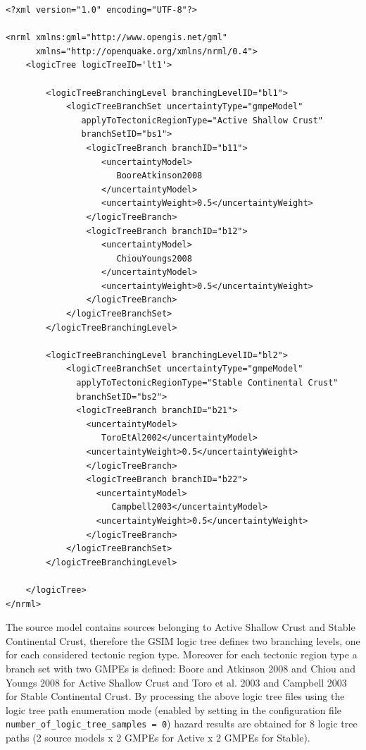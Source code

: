 \begin{Verbatim}[frame=single, commandchars=\\\{\}, fontsize=\normalsize]
<?xml version="1.0" encoding="UTF-8"?>

<nrml xmlns:gml="http://www.opengis.net/gml"
      xmlns="http://openquake.org/xmlns/nrml/0.4">
    <logicTree logicTreeID='lt1'>

        <logicTreeBranchingLevel branchingLevelID="bl1">
            <logicTreeBranchSet uncertaintyType="gmpeModel"
               applyToTectonicRegionType="Active Shallow Crust"
               branchSetID="bs1">
                <logicTreeBranch branchID="b11">
                   <uncertaintyModel>
                      BooreAtkinson2008
                   </uncertaintyModel>
                   <uncertaintyWeight>0.5</uncertaintyWeight>
                </logicTreeBranch>
                <logicTreeBranch branchID="b12">
                   <uncertaintyModel>
                      ChiouYoungs2008
                   </uncertaintyModel>
                   <uncertaintyWeight>0.5</uncertaintyWeight>
                </logicTreeBranch>
            </logicTreeBranchSet>
        </logicTreeBranchingLevel>

        <logicTreeBranchingLevel branchingLevelID="bl2">
            <logicTreeBranchSet uncertaintyType="gmpeModel"
              applyToTectonicRegionType="Stable Continental Crust"
              branchSetID="bs2">
              <logicTreeBranch branchID="b21">
                <uncertaintyModel>
                   ToroEtAl2002</uncertaintyModel>
                <uncertaintyWeight>0.5</uncertaintyWeight>
                </logicTreeBranch>
                <logicTreeBranch branchID="b22">
                  <uncertaintyModel>
                     Campbell2003</uncertaintyModel>
                  <uncertaintyWeight>0.5</uncertaintyWeight>
                </logicTreeBranch>
            </logicTreeBranchSet>
        </logicTreeBranchingLevel>

    </logicTree>
</nrml>
\end{Verbatim}
The source model contains sources belonging to Active Shallow Crust and Stable Continental Crust, therefore the
GSIM logic tree defines two branching levels, one for each considered tectonic region type. Moreover for each tectonic
region type a branch set with two GMPEs is defined: Boore and Atkinson 2008 and Chiou and Youngs 2008 for Active
Shallow Crust and Toro et al. 2003 and Campbell 2003 for Stable Continental Crust. By processing the above logic tree
files using the logic tree path enumeration mode (enabled by setting in the configuration file \texttt{number\_\-of\_\-logic\_\-tree\_\-samples = 0})
hazard results are obtained for 8 logic tree paths (2 source models x 2 GMPEs for Active x 2 GMPEs for Stable).\\

